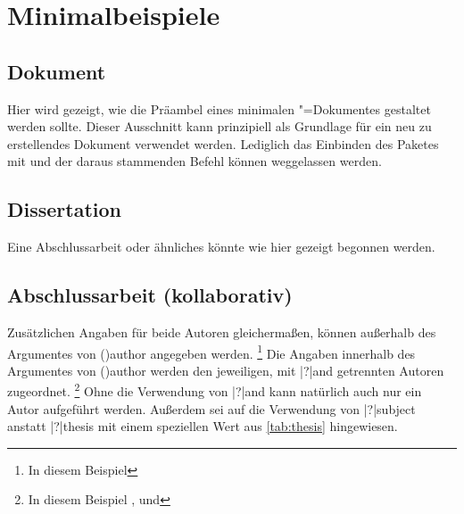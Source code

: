 \chapter{%
  Minimalbeispiele%
  \label{sec:exmpl}%
}
\section{%
  Dokument%
}
%
Hier wird gezeigt, wie die Präambel eines minimalen "=Dokumentes 
gestaltet werden sollte. Dieser Ausschnitt kann prinzipiell als Grundlage für 
ein neu zu erstellendes Dokument verwendet werden. Lediglich das Einbinden des 
Paketes  mit  und 
der daraus stammenden Befehl  können weggelassen werden.



\section{%
  Dissertation%
  \label{sec:exmpl:dissertation}%
}
%
Eine Abschlussarbeit oder ähnliches könnte wie hier gezeigt begonnen werden.



\section{%
  Abschlussarbeit (kollaborativ)%
  \label{sec:exmpl:thesis}%
}
%
Zusätzlichen Angaben für beide Autoren gleichermaßen, können außerhalb des 
Argumentes von \Macro(){author} angegeben werden.%
\footnote{In diesem Beispiel }
Die Angaben innerhalb des Argumentes von \Macro(){author} 
werden den jeweiligen, mit \Macro|?|{and} getrennten Autoren zugeordnet.%
\footnote{%
  In diesem Beispiel ,  und 
}
Ohne die Verwendung von \Macro|?|{and} kann natürlich auch nur ein Autor 
aufgeführt werden. Außerdem sei auf die Verwendung von \Macro|?|{subject} 
anstatt \Macro|?|{thesis} mit einem speziellen Wert aus \autoref{tab:thesis} 
hingewiesen.



